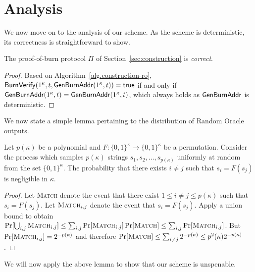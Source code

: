 \section{Analysis}

We now move on to the analysis of our scheme. As the scheme is deterministic,
its correctness is straightforward to show.

\begin{theorem}[Correctness]
  The proof-of-burn protocol $\Pi$ of Section~\ref{sec:construction} is \emph{correct}.
\end{theorem}
\begin{proof}
  Based on Algorithm~\ref{alg.construction-ro}, $\mathsf{BurnVerify}(1^\kappa, t, \mathsf{Gen}\-\mathsf{Burn}\-\mathsf{Addr}(1^\kappa, t)) = \textsf{true}$ if and only if $\mathsf{Gen}\-\mathsf{Burn}\-\mathsf{Addr}(1^\kappa, t) = \mathsf{Gen}\-\mathsf{Burn}\-\mathsf{Addr}(1^\kappa, t)$, which always holds as $\mathsf{Gen}\-\mathsf{Burn}\-\mathsf{Addr}$ is deterministic.
\end{proof}

We now state a simple lemma pertaining to the distribution of Random Oracle
outputs.

\begin{lemma}[Perturbation]
  \label{lem.perturbation}
  Let $p(\kappa)$ be a polynomial and
  $F: \{0,1\}^\kappa \longrightarrow \{0,1\}^\kappa$ be a permutation.
  Consider the process which samples $p(\kappa)$ strings $s_1, s_2, \dots, s_{p(\kappa)}$ uniformly at random from the set $\{0, 1\}^\kappa$. The probability that there exists $i \neq j$ such that $s_i = F(s_j)$ is negligible in $\kappa$.
\end{lemma}
\begin{proof}
  Let \textsc{Match} denote the event that there exist $1 \leq i \neq j \leq p(\kappa)$ such that $s_i = F(s_j)$.
  Let $\textsc{Match}_{i, j}$ denote the event that $s_i = F(s_j)$. Apply a union bound to obtain
  $
    \Pr[\bigcup_{i, j}\textsc{Match}_{i, j}] \leq \sum_{i, j} \Pr[\textsc{Match}_{i, j}]
    \Pr[\textsc{Match}] \leq \sum_{i, j} \Pr[\textsc{Match}_{i, j}]
  $.
  But $\Pr[\textsc{Match}_{i, j}] = 2^{-p(\kappa)}$ and therefore
  $\Pr[\textsc{Match}] \leq \sum_{i \neq j} 2^{-p(\kappa)} \leq p^2(\kappa) 2^{-p(\kappa)}$.
\end{proof}

We will now apply the above lemma to show that our scheme is unspenable.

